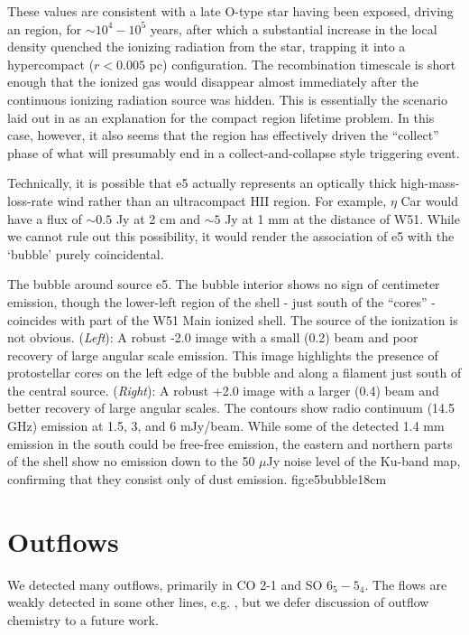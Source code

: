 \documentclass{emulateapj}
\begin{document}
These values are consistent with a late O-type star having been exposed,
driving an \hii region, for $\sim10^4-10^5$ years, after which a substantial
increase in the local density quenched the ionizing radiation from the star,
trapping it into a hypercompact ($r<0.005$ pc) configuration.  The
recombination timescale is short enough that the ionized gas would disappear
almost immediately after the continuous ionizing radiation source was hidden.
This is essentially the scenario laid out in \citet{de-Pree2014a} as an
explanation for the compact \hii region lifetime problem.  In this case,
however, it also seems that the \hii region has effectively driven the
``collect'' phase of what will presumably end in a collect-and-collapse style
triggering event.

Technically, it is possible that e5 actually represents an optically thick
high-mass-loss-rate wind rather than an ultracompact HII region. 
For example, $\eta$ Car would have a flux of $\sim0.5$ Jy at 2 cm
and $\sim5$ Jy at 1 mm at the distance of W51.  While we cannot rule out
this possibility, it would render the association of e5 with the `bubble'
purely coincidental.

{The bubble around source e5.  The bubble interior shows no sign of centimeter
emission, though the lower-left region of the shell - just south of the
``cores'' - coincides with part of the W51 Main ionized shell.  The source of
the ionization is not obvious.
({\it Left}): A robust -2.0 image with a small (0.2\arcsec) beam and poor
recovery of large angular scale emission.  This image highlights the presence
of protostellar cores on the left edge of the bubble and along a filament just
south of the central source.
({\it Right}): A robust +2.0 image with a larger (0.4\arcsec) beam and better
recovery of large angular scales.  The contours show radio continuum (14.5 GHz)
emission at 1.5, 3, and 6 mJy/beam.  While some of the detected 1.4 mm emission
in the south could be free-free emission, the eastern and northern parts of the
shell show no emission down to the 50 $\mu$Jy noise level of the Ku-band map,
confirming that they consist only of dust emission.
}{fig:e5bubble}{1}{8cm}


\section{Outflows}
\label{sec:outflows}
We detected many outflows, primarily in CO 2-1 and SO $6_5-5_4$.  The flows are
weakly detected in some other lines, e.g. \formaldehyde, but we defer
discussion of outflow chemistry to a future work.
\end{document}
